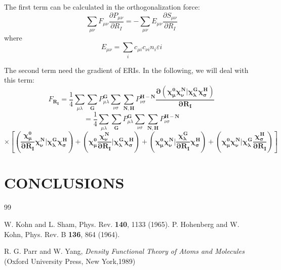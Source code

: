 \documentclass[aps,preprint,12pt]{revtex4-1}
\begin{document}
The first term can be calculated in the orthogonalization force:
\begin{equation}
 \sum_{\mu\nu}{F_{\mu\nu}\dfrac{\partial{P_{\mu\nu}}}{\partial{R_{I}}}}=
-\sum_{\mu\nu}{E_{\mu\nu}\dfrac{\partial{S_{\mu\nu}}}{\partial{R_{I}}}}
\end{equation}
where
\[
 E_{\mu\nu}=\sum_{i}{c_{\mu i}c_{\nu i}n_i\varepsilon{i} }
\]


The second term need the gradient of ERIs. In the following, we will deal with this term: 
\[
 F_{\mathbf{R_I}}=\frac{1}{4}\sum_{\mu\lambda}\sum_{\mathbf{G}}P_{\mu\lambda}^{\mathbf{G}}\sum_{\nu\sigma}\sum_{\mathbf{N,H}}P_{\nu\sigma}^\mathbf{H-N}\mathbf{ \dfrac{\partial{(\chi_{\mu}^{0}\chi_{\nu}^{N}|\chi_{\lambda}^{G}\chi_{\sigma}^{H})}}{\partial{R_{I}}} }
\]
\[
 =\frac{1}{4}\sum_{\mu\lambda}\sum_{\mathbf{G}}P_{\mu\lambda}^{\mathbf{G}}\sum_{\nu\sigma}\sum_{\mathbf{N,H}}P_{\nu\sigma}^\mathbf{H-N}
\]
\begin{equation}
\times\mathbf{[ (\dfrac{\chi_{\mu}^{0}}{\partial{R_{I}}}\chi_{\nu}^{N}|\chi_{\lambda}^{G}\chi_{\sigma}^{H})
+(\chi_{\mu}^{0}\dfrac{\chi_{\nu}^{N}}{\partial{R_{I}}}|\chi_{\lambda}^{G}\chi_{\sigma}^{H}) 
+(\chi_{\mu}^{0}\chi_{\nu}^{N}|\dfrac{\chi_{\lambda}^{G}}{\partial{R_{I}}}\chi_{\sigma}^{H}) 
+(\chi_{\mu}^{0}\chi_{\nu}^{N}|\chi_{\lambda}^{G}\dfrac{\chi_{\sigma}^{H}}{\partial{R_{I}}})   ]}
\end{equation}




\section{CONCLUSIONS}

\begin{acknowledgments}

\end{acknowledgments}


\begin{thebibliography} {99}


 W. Kohn and L. Sham, Phys. Rev. {\bf 140}, 1133 (1965).
 P. Hohenberg and W. Kohn, Phys. Rev. B {\bf 136}, 864 (1964).

 R. G. Parr and W. Yang, \emph{Density Functional Theory of Atoms and Molecules }(Oxford University Press, New York,1989)

\end{thebibliography}
\end{document}
